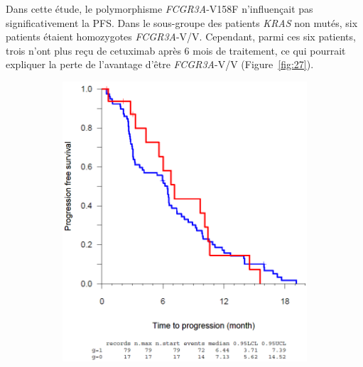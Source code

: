 Dans cette étude, le polymorphisme \textit{FCGR3A}-V158F n'influençait pas significativement la PFS. Dans le sous-groupe des patients \textit{KRAS} non mutés, six patients étaient homozygotes \textit{FCGR3A}-V/V. Cependant, parmi ces six patients, trois n'ont plus reçu de cetuximab après 6 mois de traitement, ce qui pourrait expliquer la perte de l'avantage d'être \textit{FCGR3A}-V/V (Figure~\ref{fig:27}). 
\begin{figure}[htbp]
 \begin{subfigure}[b]{0.33\linewidth}
    \centering
    \includegraphics[width=0.95\linewidth]{figures/raster/FIG_27a} 
  \end{subfigure} 
 \begin{subfigure}[b]{0.33\linewidth}
    \centering

\end{subfigure}
\end{figure}
